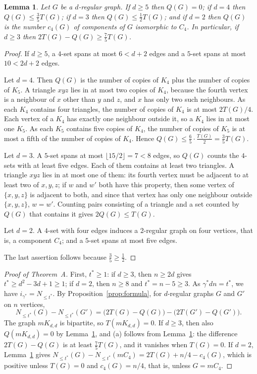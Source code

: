 \documentclass[11pt]{article}
\newtheorem{lemma}[theorem]{Lemma}
\theoremstyle{remark}
\newcommand{\Nle}[1]{N_{\le #1}}
\begin{document}
\begin{lemma}\label{lem:Q}
Let $G$ be a $d$-regular graph. If $d\ge5$ then $Q(G)=0$; if $d=4$ then
$Q(G)\le\frac35T(G)$; if $d=3$ then $Q(G)\le\frac12T(G)$; and if $d=2$ then
$Q(G)$ is the number $c_4(G)$ of components of $G$ isomorphic to $C_4$. In
particular, if $d\ge3$ then $2T(G)-Q(G)\ge\frac75T(G)$.
\end{lemma}
\begin{proof}
If $d\ge5$, a $4$-set spans at most $6<d+2$ edges and a $5$-set spans at most
$10<2d+2$ edges.

Let $d=4$. Then $Q(G)$ is the number of copies of $K_4$ plus the number of
copies of $K_5$. A triangle $xyz$ lies in at most two copies of $K_4$, because
the fourth vertex is a neighbour of $x$ other than $y$ and $z$, and $x$ has
only two such neighbours. As each $K_4$ contains four triangles, the number
of copies of $K_4$ is at most $2T(G)/4$. Each vertex of a $K_4$ has exactly one
neighbour outside it, so a $K_4$ lies in at most one $K_5$. As each $K_5$
contains five copies of $K_4$, the number of copies of $K_5$ is at most a
fifth of the number of copies of $K_4$. Hence
$Q(G)\le\frac65\cdot\frac{T(G)}2=\frac35T(G)$.

Let $d=3$. A $5$-set spans at most $\lfloor15/2\rfloor=7<8$ edges, so $Q(G)$
counts the $4$-sets with at least five edges. Each of them contains at least
two triangles. A triangle $xyz$ lies in at most one of them: its fourth
vertex must be adjacent to at least two of $x,y,z$; if $w$ and $w'$ both have
this property, then some vertex of $\{x,y,z\}$ is adjacent to both, and since
that vertex has only one neighbour outside $\{x,y,z\}$, $w=w'$. Counting pairs
consisting of a triangle and a set counted by $Q(G)$ that contains it gives
$2Q(G)\le T(G)$.

Let $d=2$. A $4$-set with four edges induces a $2$-regular graph on four
vertices, that is, a component $C_4$; and a $5$-set spans at most five edges.

The last assertion follows because $\frac35\ge\frac12$.
\end{proof}

\begin{proof}[Proof of Theorem~A]
First, $t^*\ge1$: if $d\ge3$, then $n\ge2d$ gives $t^*\ge d^2-3d+1\ge1$; if
$d=2$, then $n\ge8$ and $t^*=n-5\ge3$. As $\gamma^*dn=t^*$, we have
$i_{\gamma^*}=\Nle{t^*}$. By Proposition~\ref{prop:formula}, for $d$-regular
graphs $G$ and $G'$ on $n$ vertices,
\[
 \Nle{t^*}(G)-\Nle{t^*}(G')=\bigl(2T(G)-Q(G)\bigr)-\bigl(2T(G')-Q(G')\bigr).
\]
The graph $mK_{d,d}$ is bipartite, so $T(mK_{d,d})=0$. If $d\ge3$, then also
$Q(mK_{d,d})=0$ by Lemma~\ref{lem:Q}, and (a) follows from
Lemma~\ref{lem:Q}: the difference $2T(G)-Q(G)$ is at least $\frac75T(G)$, and
it vanishes when $T(G)=0$. If $d=2$, Lemma~\ref{lem:Q} gives
$\Nle{t^*}(G)-\Nle{t^*}(mC_4)=2T(G)+n/4-c_4(G)$, which is positive unless
$T(G)=0$ and $c_4(G)=n/4$, that is, unless $G=mC_4$.
\end{proof}
\end{document}
